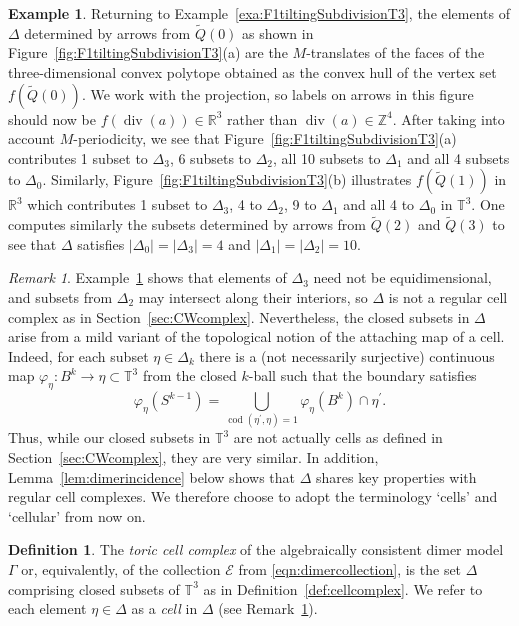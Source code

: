 \documentclass[11pt,a4paper]{amsart}
\numberwithin{equation}{section}
\theoremstyle{definition}
\newtheorem{definition}[theorem]{Definition}
\newtheorem{example}[theorem]{Example}
\theoremstyle{remark}
\newtheorem{remark}[theorem]{Remark}
\newcommand{\RR}{\ensuremath{\mathbb{R}}}
\newcommand{\ZZ}{\ensuremath{\mathbb{Z}}}
\newcommand{\codim}{\operatorname{cod}}
\renewcommand{\div}{\operatorname{div}}
\begin{document}
\begin{example}
\label{exa:F1tiltingGamma}
Returning to Example~\ref{exa:F1tiltingSubdivisionT3}, the elements of $\Delta$ determined by arrows from $\widetilde{Q}(0)$ as shown in Figure~\ref{fig:F1tiltingSubdivisionT3}(a) are the $M$-translates of the faces of the three-dimensional convex polytope obtained as the convex hull of the vertex set $f(\widetilde{Q}(0))$. We work with the projection, so labels on arrows in this figure should now be $f(\div(a))\in \RR^3$ rather than $\div(a)\in \ZZ^4$. After taking into account $M$-periodicity, we see that Figure~\ref{fig:F1tiltingSubdivisionT3}(a) contributes 1 subset to $\Delta_3$, 6 subsets to $\Delta_2$, all 10 subsets to $\Delta_1$ and all 4 subsets to $\Delta_0$. Similarly, Figure~\ref{fig:F1tiltingSubdivisionT3}(b) illustrates $f(\widetilde{Q}(1))$ in $\RR^3$ which contributes 1 subset to $\Delta_3$, 4 to $\Delta_2$, 9 to $\Delta_1$ and all 4 to $\Delta_0$ in $\mathbb{T}^3$. One computes similarly the subsets determined by arrows from $\widetilde{Q}(2)$ and $\widetilde{Q}(3)$ to see that $\Delta$ satisfies $\vert \Delta_0\vert = \vert \Delta_3\vert = 4$ and $\vert \Delta_1\vert = \vert \Delta_2\vert = 10$.
 \end{example}

\begin{remark}
\label{rem:CWcomplex}
Example~\ref{exa:F1tiltingGamma} shows that elements of $\Delta_3$ need not be equidimensional, and subsets from $\Delta_2$ may intersect along their interiors, so $\Delta$ is not a regular cell complex as in Section~\ref{sec:CWcomplex}. Nevertheless, the closed subsets in $\Delta$ arise from a mild variant of the topological notion of the attaching map of a cell. Indeed, for each subset $\eta\in \Delta_k$ there is a (not necessarily surjective) continuous map $\varphi_\eta \colon B^k\to \eta\subset \mathbb{T}^3$  from the closed $k$-ball such that the boundary satisfies 
\[
\varphi_\eta(S^{k-1}) = \bigcup_{\codim(\eta^\prime, \eta)=1} \varphi_\eta(B^k)\cap\eta^{\prime}.
\]
Thus, while our closed subsets in $\mathbb{T}^3$ are not actually cells as defined in Section~\ref{sec:CWcomplex}, they are very similar.  In addition, Lemma~\ref{lem:dimerincidence} below shows that $\Delta$ shares key properties with regular cell complexes. We therefore choose to adopt the terminology `cells' and `cellular' from now on.
\end{remark}

\begin{definition}
The \emph{toric cell complex} of the algebraically consistent dimer model $\Gamma$ or, equivalently, of the collection $\mathscr{E}$ from \eqref{eqn:dimercollection}, is the set $\Delta$ comprising closed subsets of $\mathbb{T}^3$ as in Definition~\ref{def:cellcomplex}. We refer to each element $\eta\in \Delta$ as a \emph{cell} in $\Delta$ (see Remark~\ref{rem:CWcomplex}).
\end{definition}
\end{document}

